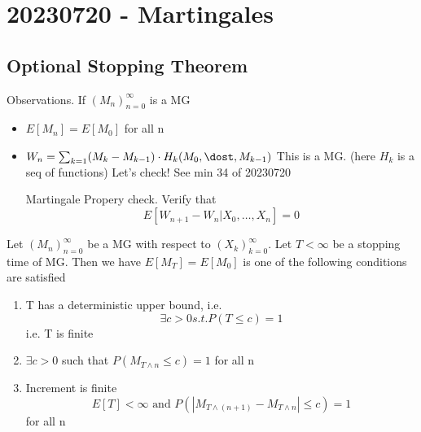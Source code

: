 \documentclass{report}
\begin{document}
\chapter{20230720 - Martingales}%
  \section{Optional Stopping Theorem}%
  Observations.  If $(M_n)^{\infty}_{n=0}$ is a MG
  \begin{itemize}
    \item $E[M_n] = E[M_0]$ for all n
    \item $W_n = \sum^{}_{k=1} (M_k - M_{k-1}) \cdot H_k(M_0, \dost, M_{k-1})$
      This is a MG.  (here $H_k$ is a seq of functions)
      Let's check!  See min 34 of 20230720

      Martingale Propery check.  Verify that
      \[ E[W_{n+1} - W_n | X_0, \dots, X_n ] = 0 \]
  \end{itemize}
   {
    Let $(M_n)^{\infty}_{n=0}$ be a MG with respect to 
    $(X_k)^{\infty}_{k=0}$.  Let $T < \infty$ be a stopping time of MG.
    Then we have $E[M_T] = E[M_0]$ is one of the following conditions
    are satisfied
    \begin{enumerate}
      \item T has a deterministic upper bound, i.e.
        \[ \exists c > 0 s.t. P(T \leq c) = 1 \]
        i.e. T is finite
      \item $\exists c > 0$ such that $P(M_{T \wedge n} \leq c) = 1$
        for all n
      \item Increment is finite
        \[ E[T] < \infty \text{ and } P(|M_{T \wedge(n+1)} - M_{T \wedge n} | \leq c) = 1   \]
          for all n
    \end{enumerate}
  }
   {
    
  }
  
\end{document}

